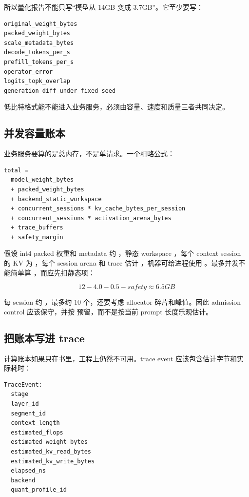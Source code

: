 所以量化报告不能只写“模型从 14GB 变成 3.7GB”。它至少要写：

\begin{lstlisting}[numbers=none,caption={量化收益报告字段}]
original_weight_bytes
packed_weight_bytes
scale_metadata_bytes
decode_tokens_per_s
prefill_tokens_per_s
operator_error
logits_topk_overlap
generation_diff_under_fixed_seed
\end{lstlisting}

低比特格式能不能进入业务服务，必须由容量、速度和质量三者共同决定。

\subsection{并发容量账本}

业务服务要算的是总内存，不是单请求。一个粗略公式：

\begin{lstlisting}[numbers=none,caption={服务内存预算}]
total =
  model_weight_bytes
  + packed_weight_bytes
  + backend_static_workspace
  + concurrent_sessions * kv_cache_bytes_per_session
  + concurrent_sessions * activation_arena_bytes
  + trace_buffers
  + safety_margin
\end{lstlisting}

假设 int4 packed 权重和 metadata 约 ，静态 workspace ，每个  context session 的 KV 为 ，每个 session arena 和 trace 估计 ，机器可给进程使用 。最多并发不能简单算 ，而应先扣静态项：

\[
12 - 4.0 - 0.5 - safety \approx 6.5GB
\]

每 session 约 ，最多约 10 个，还要考虑 allocator 碎片和峰值。因此 admission control 应该保守，并按  预留，而不是按当前 prompt 长度乐观估计。

\subsection{把账本写进 trace}

计算账本如果只在书里，工程上仍然不可用。trace event 应该包含估计字节和实际耗时：

\begin{lstlisting}[numbers=none,caption={账本相关 trace 字段}]
TraceEvent:
  stage
  layer_id
  segment_id
  context_length
  estimated_flops
  estimated_weight_bytes
  estimated_kv_read_bytes
  estimated_kv_write_bytes
  elapsed_ns
  backend
  quant_profile_id
\end{lstlisting}

